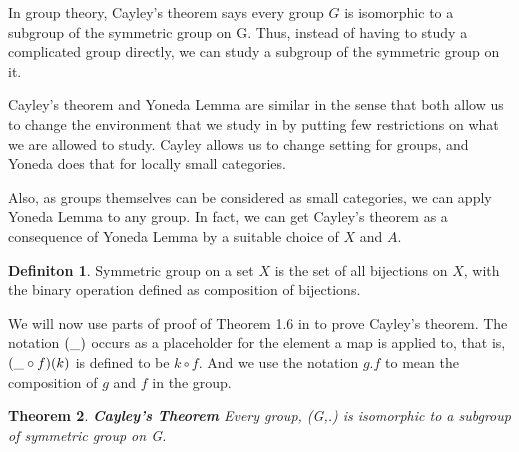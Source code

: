 \documentclass[18pt,a4paper]{article}
\newtheorem{theorem}{Theorem}[section]
\theoremstyle{definition}
\newtheorem{definition}[theorem]{Definiton}
\begin{document}
	In group theory, Cayley's theorem says every group $G$ is isomorphic to a subgroup of the symmetric
	group on G. Thus, instead of having to study a complicated group directly, we can study a subgroup of
	the symmetric group on it.

	Cayley's theorem and Yoneda Lemma are similar in the sense that both allow us to change the environment
	that we study in by putting few restrictions on what we are allowed to study. Cayley allows us to
	change setting for groups, and Yoneda does that for locally small categories.

	Also, as groups themselves can be considered as small categories, we can apply Yoneda Lemma to any
	group. In fact, we can get Cayley's theorem as a consequence of Yoneda Lemma by a suitable
	choice of $X$ and $A$.
	\begin{definition} %
		Symmetric group on a set $X$ is the set of all bijections on $X$, with the binary operation
		defined as composition of bijections.
	\end{definition}
	We will now use parts of proof of Theorem 1.6 in to prove Cayley's theorem. The notation $(\string _)$
	occurs as a placeholder for the element a map is applied to, that is, $(\string _ \circ f)(k)$ is
	defined to be $k \circ f$. And we use the notation $g.f$ to mean the composition of $g$ and $f$
	in the group.
	\begin{theorem}{\textbf{Cayley's Theorem}} %
		Every group, (G,.) is isomorphic to a subgroup of symmetric group on G.
	\end{theorem}
\end{document}
